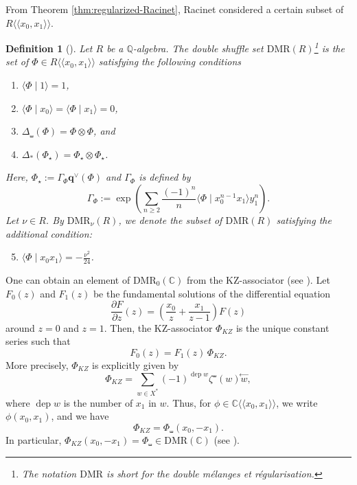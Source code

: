 \documentclass[15pt,oneside,reqno]{amsart}
\newcounter{dfcounter}
\newtheorem{df}{Definition}[dfcounter]
\theoremstyle{remark}{
\newtheorem{lem}[df]{Lemma}
\newtheorem{prop}[df]{Proposition}
\newtheorem{ex}[df]{Example}
\newtheorem{rmk}[df]{Remark}
}
\newcommand{\del}{\partial}
\newcommand{\C}{\mathbb{C}}
\newcommand{\DMR}{\mathrm{DMR}}
\DeclareMathOperator{\dep}{dep}
\begin{document}
From Theorem \ref{thm:regularized-Racinet}, Racinet considered a certain subset of $R\langle \langle x_0,x_1 \rangle \rangle$. 
\begin{df}[{\cite[D\'{e}finition 3.2.1]{Racinet}}]\label{def:DMR}
Let $R$ be a $\mathbb{Q}$-algebra.
The double shuffle set $\DMR(R)$\footnote{The notation $\DMR$ is short for the \emph{double mélanges et r\'{e}gularisation}.} is the set of $\Phi \in R  \langle  \langle x_0,x_1 \rangle \rangle $ satisfying the following conditions
\begin{enumerate}
\item\label{def:DMR-1} $\langle \Phi \mid 1\rangle = 1$,
\item\label{def:DMR-2} $\langle \Phi \mid x_0\rangle = \langle \Phi \mid x_1\rangle = 0$,
\item\label{def:DMR-3} $\Delta_{\shuffle}(\Phi) = \Phi\otimes \Phi$, and
\item\label{def:DMR-4} $\Delta_{*}(\Phi_{\star}) = \Phi_{\star} \otimes \Phi_{\star}$.
\end{enumerate}
Here, $\Phi_{\star} := \Gamma_{\Phi}\mathbf{q}^{\vee}(\Phi)$ and $\Gamma_{\Phi}$ is defined by
\[
\Gamma_{\Phi} := \exp \left(\sum_{n\ge 2}\frac{(-1)^{n}}{n}\langle \Phi \mid x_0^{n-1}x_1 \rangle y_1^n\right).
\]
Let $\nu\in R$. By $\DMR_{\nu}(R)$, we denote the subset of $\DMR(R)$ satisfying the additional condition:
\begin{enumerate}
\setcounter{enumi}{4}
\item\label{def:DMR-5} $\langle \Phi \mid x_0x_1\rangle =- \frac{ \nu^2 }{24}$.
\end{enumerate} 
\end{df}

One can obtain an element of $\DMR_0(\C)$ from the KZ-associator (see \cite[Section 3.9.5]{from-numbers-to-motives}).
Let $F_0(z)$ and $F_1(z)$ be the fundamental solutions  of the differential equation
\[
\frac{\del F}{\del z}(z) = \left(\frac{x_0}{z} + \frac{x_1}{z-1} \right) F(z)
\]
around $z = 0$ and  $z = 1$.
Then, the KZ-associator $\Phi_{KZ}$ is the unique constant series such that
\[
F_0(z)=F_1(z)\,\Phi_{KZ}.
\]
More precisely, $\Phi_{KZ}$ is explicitly given by
\[
\Phi_{KZ} = \sum_{w \in X^*} (-1)^{\dep w} \zeta^{\shuffle}(w) \overset{\leftarrow}{w},
\]
where $\dep w$ is the number of $x_1$ in $w$.
Thus, for $\phi \in \C\langle \langle x_0,x_1\rangle\rangle$, we write $\phi(x_0,x_1)$, and we have
\[
\Phi_{KZ} = \Phi_{\shuffle}(x_0,-x_1).
\]
In particular, $\Phi_{KZ}(x_0,-x_1) = \Phi_{\shuffle} \in \DMR(\C)$ (see \cite[Section 3.2.3]{Racinet}).
\end{document}
